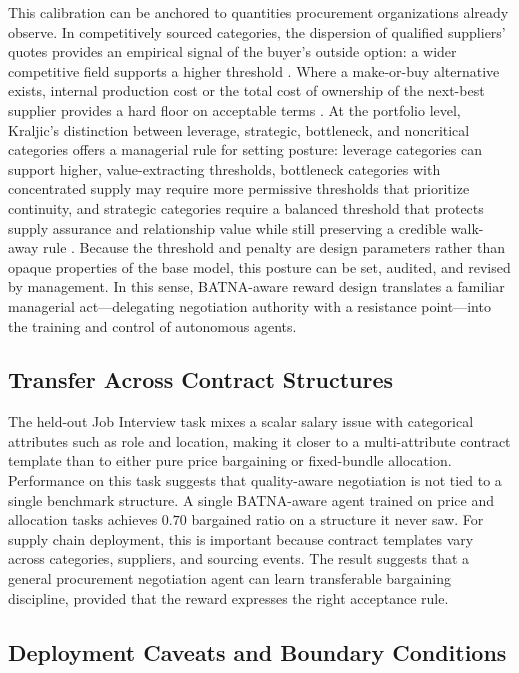 \documentclass{interact}
\theoremstyle{plain}
\theoremstyle{definition}
\theoremstyle{remark}
\begin{document}
This calibration can be anchored to quantities procurement organizations already observe. In competitively sourced categories, the dispersion of qualified suppliers' quotes provides an empirical signal of the buyer's outside option: a wider competitive field supports a higher threshold \cite{kaufmann2004mode}. Where a make-or-buy alternative exists, internal production cost or the total cost of ownership of the next-best supplier provides a hard floor on acceptable terms \cite{williamson1985economic,ellram1995total}. At the portfolio level, Kraljic's distinction between leverage, strategic, bottleneck, and noncritical categories offers a managerial rule for setting posture: leverage categories can support higher, value-extracting thresholds, bottleneck categories with concentrated supply may require more permissive thresholds that prioritize continuity, and strategic categories require a balanced threshold that protects supply assurance and relationship value while still preserving a credible walk-away rule \cite{kraljic1983purchasing,nyaga2013power}. Because the threshold and penalty are design parameters rather than opaque properties of the base model, this posture can be set, audited, and revised by management. In this sense, BATNA-aware reward design translates a familiar managerial act---delegating negotiation authority with a resistance point---into the training and control of autonomous agents.

\subsection{Transfer Across Contract Structures}

The held-out Job Interview task mixes a scalar salary issue with categorical attributes such as role and location, making it closer to a multi-attribute contract template than to either pure price bargaining or fixed-bundle allocation. Performance on this task suggests that quality-aware negotiation is not tied to a single benchmark structure. A single BATNA-aware agent trained on price and allocation tasks achieves $0.70$ bargained ratio on a structure it never saw. For supply chain deployment, this is important because contract templates vary across categories, suppliers, and sourcing events. The result suggests that a general procurement negotiation agent can learn transferable bargaining discipline, provided that the reward expresses the right acceptance rule.

\subsection{Deployment Caveats and Boundary Conditions}
\end{document}
